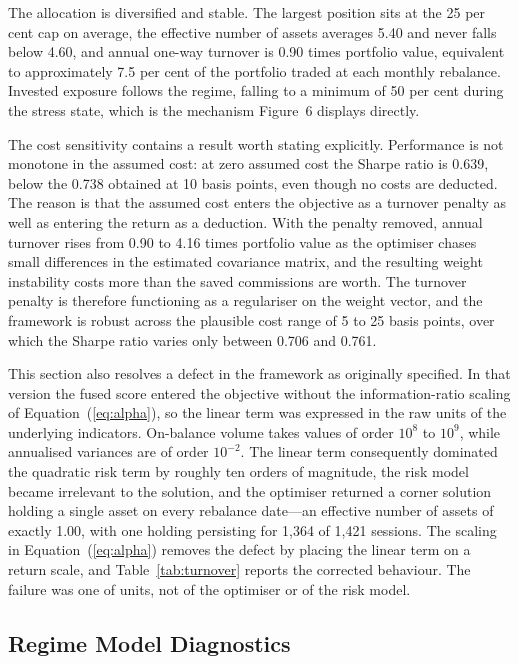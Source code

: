 \documentclass{singlecol-new}
\theoremstyle{TH}{
\newtheorem{lemma}{Lemma}
\newtheorem{theorem}[lemma]{Theorem}
\newtheorem{corrolary}[lemma]{Corrolary}
\newtheorem{conjecture}[lemma]{Conjecture}
\newtheorem{proposition}[lemma]{Proposition}
\newtheorem{claim}[lemma]{Claim}
\newtheorem{stheorem}[lemma]{Wrong Theorem}
\newtheorem{algorithm}{Algorithm}
}
\theoremstyle{THrm}{
\newtheorem{definition}{Definition}[section]
\newtheorem{question}{Question}[section]
\newtheorem{remark}{Remark}
\newtheorem{scheme}{Scheme}
}
\theoremstyle{THhit}{
\newtheorem{case}{Case}[section]
}
\begin{document}
The allocation is diversified and stable. The largest position sits at the 25 per cent
cap on average, the effective number of assets averages 5.40 and never falls below
4.60, and annual one-way turnover is 0.90 times portfolio value, equivalent to
approximately 7.5 per cent of the portfolio traded at each monthly rebalance. Invested
exposure follows the regime, falling to a minimum of 50 per cent during the stress
state, which is the mechanism Figure~6 displays directly.

The cost sensitivity contains a result worth stating explicitly. Performance is not
monotone in the assumed cost: at zero assumed cost the Sharpe ratio is 0.639, below the
0.738 obtained at 10 basis points, even though no costs are deducted. The reason is
that the assumed cost enters the objective as a turnover penalty as well as entering
the return as a deduction. With the penalty removed, annual turnover rises from
0.90 to 4.16 times portfolio value as the optimiser chases small differences in the
estimated covariance matrix, and the resulting weight instability costs more than the
saved commissions are worth. The turnover penalty is therefore functioning as a
regulariser on the weight vector, and the framework is robust across the plausible cost
range of 5 to 25 basis points, over which the Sharpe ratio varies only between 0.706
and 0.761.

This section also resolves a defect in the framework as originally specified. In that
version the fused score entered the objective without the information-ratio scaling of
Equation~(\ref{eq:alpha}), so the linear term was expressed in the raw units of the
underlying indicators. On-balance volume takes values of order $10^{8}$ to $10^{9}$,
while annualised variances are of order $10^{-2}$. The linear term consequently
dominated the quadratic risk term by roughly ten orders of magnitude, the risk model
became irrelevant to the solution, and the optimiser returned a corner solution holding
a single asset on every rebalance date---an effective number of assets of exactly 1.00,
with one holding persisting for 1{,}364 of 1{,}421 sessions. The scaling in
Equation~(\ref{eq:alpha}) removes the defect by placing the linear term on a return
scale, and Table~\ref{tab:turnover} reports the corrected behaviour. The failure was one of units, not
of the optimiser or of the risk model.

\subsection{Regime Model Diagnostics}
\label{sec:regimefit}
\end{document}
